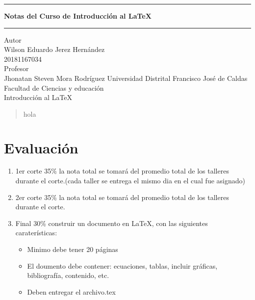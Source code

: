 \documentclass[12pt]{article}
\begin{document}

\pagestyle{empty}
\begin{center}
\begin{figure}[h]
\centering


\end{figure}
\Large
\hrule
\vspace{4mm}
\textbf{Notas del Curso de Introducción al \LaTeX}\\

\vspace{4mm}
\hrule
\large
\vfill
Autor\\

Wilson Eduardo Jerez Hernández \\
20181167034\\ 
\vfill
Profesor\\

Jhonatan Steven Mora Rodríguez
\vfill
Universidad Distrital Francisco José de Caldas\\
Facultad de Ciencias y educación\\
Introducción al \LaTeX\\
\end{center}
\newpage



\tableofcontents
\newpage
\begin{abstract}
    hola
\end{abstract}
\newpage
\section{Evaluación}
        \begin{enumerate}
            \item 1er corte 35\% la nota total se tomará del promedio total de los talleres durante el corte.(cada taller se entrega el mismo dia en el cual fue asignado)
            \item 2er corte 35\% la nota total se tomará del promedio total de los talleres durante el corte.
            \item Final 30\% construir un documento en LaTeX, con las siguientes caraterísticas: 
                \begin{itemize}
                    \item Minimo debe tener 20 páginas
                    \item El doumento debe contener: ecuaciones, tablas, incluir gráficas, bibliografía, contenido, etc.
                    \item Deben entregar el archivo.tex
                \end{itemize}
    \end{enumerate}
\end{document}
